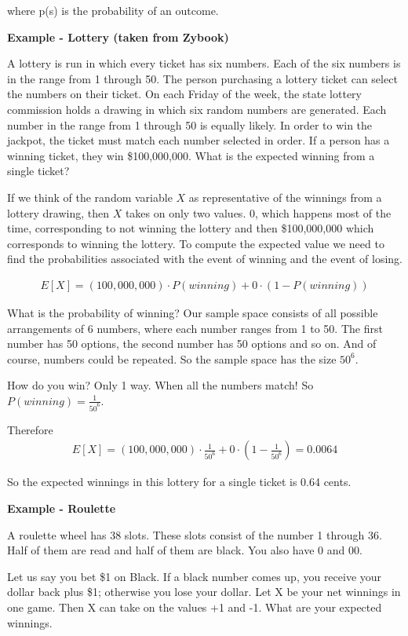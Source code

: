 \documentclass[12pt]{article}
\begin{document}
where p(s) is the probability of an outcome.

\textbf{Example - Lottery (taken from Zybook)}

A lottery is run in which every ticket has six numbers. Each of the six numbers is in the range from 1 through 50. The person purchasing a lottery ticket can select the numbers on their ticket. On each Friday of the week, the state lottery commission holds a drawing in which six random numbers are generated. Each number in the range from 1 through 50 is equally likely. In order to win the jackpot, the ticket must match each number selected in order. If a person has a winning ticket, they win \$100,000,000. What is the expected winning from a single ticket?

If we think of the random variable $X$ as representative of the winnings from a lottery drawing, then $X$ takes on only two values. 0, which happens most of the time, corresponding to not winning the lottery and then \$100,000,000 which corresponds to winning the lottery. To compute the expected value we need to find the probabilities associated with the event of winning and the event of losing.

\begin{align*}
E[X] = (100,000,000) \cdot P(winning) + 0 \cdot (1 - P(winning))
\end{align*}

What is the probability of winning? Our sample space consists of all possible arrangements of 6 numbers, where each number ranges from 1 to 50. The first number has 50 options, the second number has 50 options and so on. And of course, numbers could be repeated. So the sample space has the size $50^6$. 

How do you win? Only 1 way. When all the numbers match! So $P(winning) = \frac{1}{50^6}$.

Therefore 
\begin{align*}
E[X] = (100,000,000) \cdot \frac{1}{50^6} + 0 \cdot (1 - \frac{1}{50^6}) = 0.0064
\end{align*}

So the expected winnings in this lottery for a single ticket is 0.64 cents.

\medskip

\textbf{Example - Roulette}

A roulette wheel has 38 slots. These slots consist of the number 1 through 36. Half of them are read and half of them are black. You also have 0 and 00.  

Let us say you bet \$1 on Black. If a black number comes up, you receive
your dollar back plus \$1; otherwise you lose your dollar. Let X be your net winnings in one game. Then X can take on the values +1 and -1. What are your expected winnings.
\end{document}
